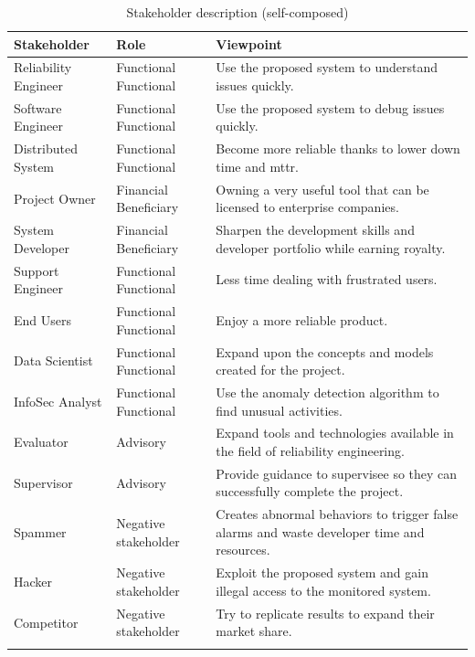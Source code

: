 \begin{longtable}{|p{35mm}|p{44mm}|p{72mm}|}
    \hline
    \textbf{Stakeholder} &
    \textbf{Role} &
    \textbf{Viewpoint} 
    \\ \hline
    
    Reliability Engineer &
    Functional Functional &
    Use the proposed system to understand issues quickly. \\ \hline
    
    Software Engineer &
    Functional Functional &
    Use the proposed system to debug issues quickly. \\ \hline
    
    Distributed System &
    Functional Functional &
    Become more reliable thanks to lower down time and \ac{mttr}. \\ \hline
    
    Project Owner &
    Financial Beneficiary &
    Owning a very useful tool that can be licensed to enterprise companies. \\ \hline
    
    System Developer &
    Financial Beneficiary &
    Sharpen the development skills and developer portfolio while earning royalty. \\ \hline
    
    Support Engineer &
    Functional Functional &
    Less time dealing with frustrated users. \\ \hline
    
    End Users &
    Functional Functional &
    Enjoy a more reliable product. \\ \hline
    
    Data Scientist &
    Functional Functional &
    Expand upon the concepts and models created for the project. \\ \hline
    
    InfoSec Analyst &
    Functional Functional &
    Use the anomaly detection algorithm to find unusual activities. \\ \hline
    
    Evaluator & 
    Advisory &
    Expand tools and technologies available in the field of reliability engineering. \\ \hline
    
    Supervisor &
    Advisory &
    Provide guidance to supervisee so they can successfully complete the project. \\ \hline
    
    Spammer &
    Negative stakeholder & Creates abnormal behaviors to trigger false alarms and waste developer time and resources. \\ \hline
    
    Hacker &
    Negative stakeholder &
    Exploit the proposed system and gain illegal access to the monitored system. \\ \hline
    
    Competitor &
    Negative stakeholder &
    Try to replicate results to expand their market share. \\ \hline
\caption{Stakeholder description (self-composed)}
\end{longtable}